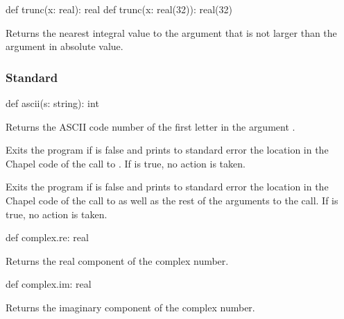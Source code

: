 \begin{protohead}
def trunc(x: real): real
def trunc(x: real(32)): real(32)
\end{protohead}
\begin{protobody}
Returns the nearest integral value to the argument that is not larger
than the argument in absolute value.
\end{protobody}


\subsubsection{Standard}
\label{Standard}

\begin{protohead}
def ascii(s: string): int
\end{protohead}
\begin{protobody}
Returns the ASCII code number of the first letter in the
argument .
\end{protobody}

\begin{protohead}
def assert(test: bool) {
\end{protohead}
\begin{protobody}
Exits the program if  is false and prints to standard error
the location in the Chapel code of the call to .
If  is true, no action is taken.
\end{protobody}

\begin{protohead}
def assert(test: bool, args ...?numArgs) {
\end{protohead}
\begin{protobody}
Exits the program if  is false and prints to standard error
the location in the Chapel code of the call to  as well
as the rest of the arguments to the call.  If  is true, no
action is taken.
\end{protobody}

\begin{protohead}
def complex.re: real
\end{protohead}
\begin{protobody}
Returns the real component of the complex number.
\end{protobody}

\begin{protohead}
def complex.im: real
\end{protohead}
\begin{protobody}
Returns the imaginary component of the complex number.
\end{protobody}

